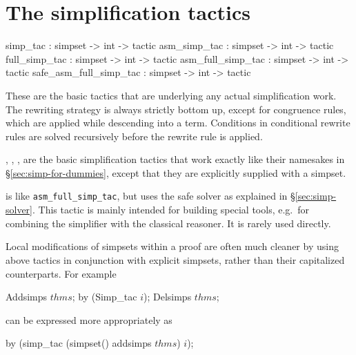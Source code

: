 \section{The simplification tactics}\label{simp-tactics}
\begin{ttbox}
simp_tac               : simpset -> int -> tactic
asm_simp_tac           : simpset -> int -> tactic
full_simp_tac          : simpset -> int -> tactic
asm_full_simp_tac      : simpset -> int -> tactic
safe_asm_full_simp_tac : simpset -> int -> tactic
\end{ttbox}

These are the basic tactics that are underlying any actual
simplification work.  The rewriting strategy is always strictly bottom
up, except for congruence rules, which are applied while descending
into a term.  Conditions in conditional rewrite rules are solved
recursively before the rewrite rule is applied.

\begin{ttdescription}
  
\item[\ttindexbold{simp_tac}, \ttindexbold{asm_simp_tac},
  \ttindexbold{full_simp_tac}, \ttindexbold{asm_full_simp_tac}] are
  the basic simplification tactics that work exactly like their
  namesakes in \S\ref{sec:simp-for-dummies}, except that they are
  explicitly supplied with a simpset.
  
\item[\ttindexbold{safe_asm_full_simp_tac}] is like
  \texttt{asm_full_simp_tac}, but uses the safe solver as explained in
  \S\ref{sec:simp-solver}.  This tactic is mainly intended for
  building special tools, e.g.\ for combining the simplifier with the
  classical reasoner.  It is rarely used directly.
  
\end{ttdescription}

\medskip

Local modifications of simpsets within a proof are often much cleaner
by using above tactics in conjunction with explicit simpsets, rather
than their capitalized counterparts.  For example
\begin{ttbox}
Addsimps \(thms\);
by (Simp_tac \(i\));
Delsimps \(thms\);
\end{ttbox}
can be expressed more appropriately as
\begin{ttbox}
by (simp_tac (simpset() addsimps \(thms\)) \(i\));
\end{ttbox}


